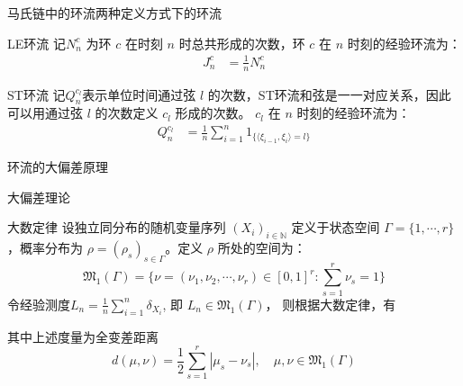 \documentclass{beamer}
\begin{document}
\begin{frame}{马氏链中的环流}{两种定义方式下的环流}
	\begin{block}{LE环流}
		记$N^c_n$ 为环 $c$ 在时刻 $n$ 时总共形成的次数，环 $c$ 在 $n$ 时刻的经验环流为：
		\begin{align*}
			J_n^c & = \frac{1}{n}N^c_n
		\end{align*}
	\end{block}
	\begin{block}{ST环流}
		记$Q^{c_l}_n$表示单位时间通过弦 $l$ 的次数，ST环流和弦是一一对应关系，因此可以用通过弦 $l$ 的次数定义 $c_l$ 形成的次数。 $c_l$ 在 $n$ 时刻的经验环流为：
		\begin{align*}
			Q^{c_l}_n & = \frac{1}{n}\sum_{i=1}^n1_{\{\langle\xi_{i-1},\xi_i\rangle=l\}}
		\end{align*}
	\end{block}
\end{frame}

\begin{frame}
	\begin{center}
		\Huge 环流的大偏差原理
	\end{center}
\end{frame}

\begin{frame}{大偏差理论}
	\begin{block}{大数定律}
		设独立同分布的随机变量序列 $\left(\mathit{X}_i \right)_{i\in \mathbb{N}}$ 定义于状态空间 $\Gamma=\{1, \cdots, r\}$，概率分布为 $\rho=(\rho_s)_{s \in \Gamma}$。定义 $\rho$ 所处的空间为：
		$$
			\mathfrak{M}_1(\Gamma) = \{\nu = (\nu_1, \nu_2, \cdots, \nu_r)\in [0,1]^r:\sum_{s=1}^r \nu_s = 1\}
		$$
		令经验测度$\mathit{L}_n = \frac{1}{n}\sum_{i=1}^{n}\delta_{\mathit{X}_i} $, 即 $\mathit{L}_n \in \mathfrak{M}_1(\Gamma)$，
		则根据大数定律，有
		\begin{figure}
			\centering
		\end{figure}
		其中上述度量为全变差距离
		$$
			d(\mu, \nu) = \frac{1}{2} \sum_{s=1}^r |\mu_s - \nu_s|, \quad \mu, \nu \in \mathfrak{M}_1(\Gamma)
		$$
	\end{block}
\end{frame}
\end{document}
